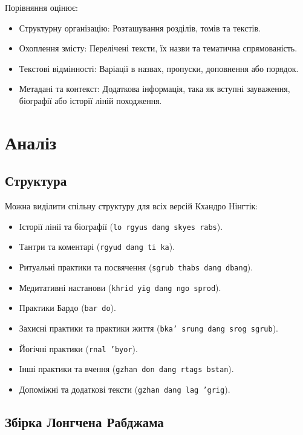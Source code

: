 \documentclass{article}
\begin{document}
Порівняння оцінює:

\begin{itemize}
\item Структурну організацію: Розташування розділів, томів та текстів.
\item Охоплення змісту: Перелічені тексти, їх назви та тематична спрямованість.
\item Текстові відмінності: Варіації в назвах, пропуски, доповнення або порядок.
\item Метадані та контекст: Додаткова інформація, така як вступні зауваження, біографії або історії ліній походження.
\end{itemize}

\newpage
\section{Аналіз}

\subsection{Структура}

Можна виділити спільну структуру для всіх версій Кхандро Нінгтік:

\begin{itemize}
\item Історії лінії та біографії (\texttt{lo rgyus dang skyes rabs}).
\item Тантри та коментарі (\texttt{rgyud dang ti ka}).
\item Ритуальні практики та посвячення (\texttt{sgrub thabs dang dbang}).
\item Медитативні настанови (\texttt{khrid yig dang ngo sprod}).
\item Практики Бардо (\texttt{bar do}).
\item Захисні практики та практики життя (\texttt{bka' srung dang srog sgrub}).
\item Йогічні практики (\texttt{rnal 'byor}).
\item Інші практики та вчення (\texttt{gzhan don dang rtags bstan}).
\item Допоміжні та додаткові тексти (\texttt{gzhan dang lag 'grig}).
\end{itemize}

\newpage
\subsection{Збірка Лонгчена Рабджама}
\end{document}

